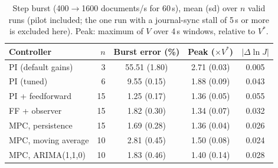 \begin{table}[t]\centering\footnotesize
\caption{Step burst (400$\to$1600 documents/s for 60\,s), mean (sd) over $n$ valid runs (pilot included; the one run with a journal-sync stall of 5\,s or more is excluded here). Peak: maximum of $V$ over 4\,s windows, relative to $V^*$.}\label{tab:main}
\begin{tabular}{lrccc}\toprule
Controller & $n$ & Burst error (\%) & Peak ($\times V^*$) & $|\Delta\ln J|$\\\midrule
PI (default gains) & 3 & 55.51 (1.80) & 2.71 (0.03) & 0.005\\
PI (tuned) & 6 & 9.55 (0.15) & 1.88 (0.09) & 0.043\\
PI + feedforward & 15 & 1.25 (0.17) & 1.36 (0.05) & 0.055\\
FF + observer & 15 & 1.82 (0.30) & 1.34 (0.07) & 0.032\\
MPC, persistence & 15 & 1.69 (0.28) & 1.36 (0.04) & 0.026\\
MPC, moving average & 10 & 2.81 (0.45) & 1.50 (0.08) & 0.024\\
MPC, ARIMA(1,1,0) & 10 & 1.83 (0.46) & 1.40 (0.14) & 0.028\\
\bottomrule\end{tabular}\end{table}
